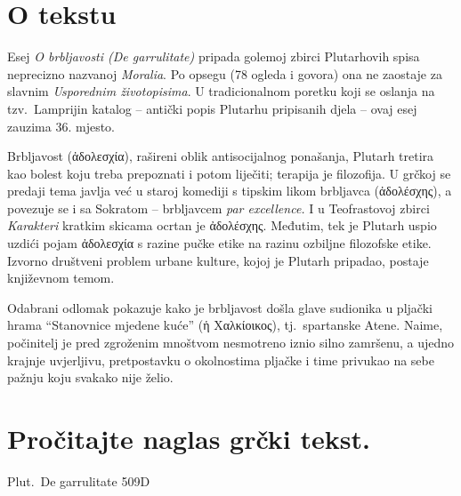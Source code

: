 

\section*{O tekstu}

Esej \textit{O brbljavosti (De garrulitate)} pripada golemoj zbirci Plutarhovih spisa neprecizno nazvanoj \textit{Moralia}. Po opsegu (78 ogleda i govora) ona ne zaostaje za slavnim \textit{Usporednim životopisima}. U tradicionalnom poretku koji se oslanja na tzv.\ Lamprijin katalog – antički popis Plutarhu pripisanih djela – ovaj esej zauzima 36. mjesto. 

Brbljavost \textgreek[variant=ancient]{(ἀδολεσχία),} rašireni oblik antisocijalnog ponašanja, Plutarh tretira kao bolest koju treba prepoznati i potom liječiti; terapija je filozofija. U grčkoj se predaji tema javlja već u staroj komediji s tipskim likom brbljavca \textgreek[variant=ancient]{(ἀδολέσχης)}, a povezuje se i sa Sokratom – brbljavcem \textit{par excellence.} I u Teofrastovoj zbirci \textit{Karakteri} kratkim skicama ocrtan je \textgreek[variant=ancient]{ἀδολέσχης.} Međutim, tek je Plutarh uspio uzdići pojam \textgreek[variant=ancient]{ἀδολεσχία} s razine pučke etike na razinu ozbiljne filozofske etike. Izvorno društveni problem urbane kulture, kojoj je Plutarh pripadao, postaje književnom temom.

Odabrani odlomak pokazuje kako je brbljavost došla glave sudionika u pljački hrama ``Stanovnice mjedene kuće'' \textgreek[variant=ancient]{(ἡ Χαλκίοικος),} tj.\ spartanske Atene. Naime, počinitelj je pred zgroženim mnoštvom nesmotreno iznio silno zamršenu, a ujedno krajnje uvjerljivu, pretpostavku o okolnostima pljačke i time privukao na sebe pažnju koju svakako nije želio.


\section*{Pročitajte naglas grčki tekst.}

Plut.\ De garrulitate 509D


\medskip


